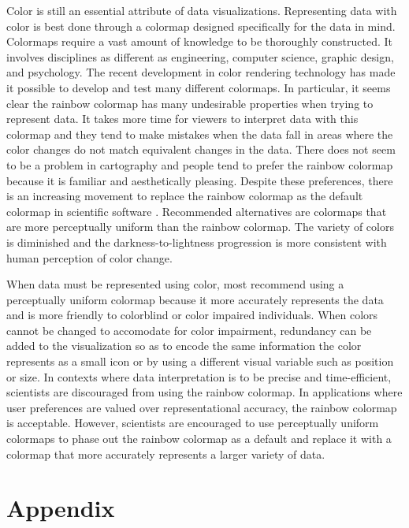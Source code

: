 \documentclass[journal]{IEEEtran}
\begin{document}
Color is still an essential attribute of data visualizations. Representing data
with color is best done through a colormap designed specifically for the data in
mind.
Colormaps require a vast amount of knowledge to be thoroughly constructed. It 
involves disciplines as different as engineering, computer science, graphic design,
and psychology. The recent development in color rendering technology has made it 
possible to develop and test many different colormaps. In particular, it seems clear
the rainbow colormap has many undesirable properties when trying to represent data.
It takes more time for viewers to interpret data with this colormap and they tend to
make mistakes when the data fall in areas where the color changes do not match 
equivalent changes in the data. There does not seem to be a problem in cartography
and people tend to prefer the rainbow colormap because it is familiar and aesthetically pleasing.
Despite these preferences, there is an increasing movement to replace the rainbow
colormap as the default colormap in scientific software \cite{matlab}. Recommended
alternatives are colormaps that are more perceptually uniform than the rainbow 
colormap. The variety of colors is diminished and the darkness-to-lightness progression
is more consistent with human perception of color change.

When data must be represented using color, most recommend using a perceptually
uniform colormap because it more accurately represents the data and is more 
friendly to colorblind or color impaired individuals. When colors cannot be changed
to accomodate for color impairment, redundancy can be added to the visualization
so as to encode the same information the color represents as a small icon or by using
a different visual variable such as position or size. In contexts where data
interpretation is to be precise and time-efficient, scientists are discouraged from
using the rainbow colormap. In applications where user preferences are valued over representational accuracy, the rainbow colormap is acceptable. However, scientists
are encouraged to use perceptually uniform colormaps to phase out the rainbow colormap
as a default and replace it with a colormap that more accurately represents a larger
variety of data.


\ifCLASSOPTIONcaptionsoff
  \newpage
\fi

\section{Appendix}
\end{document}
